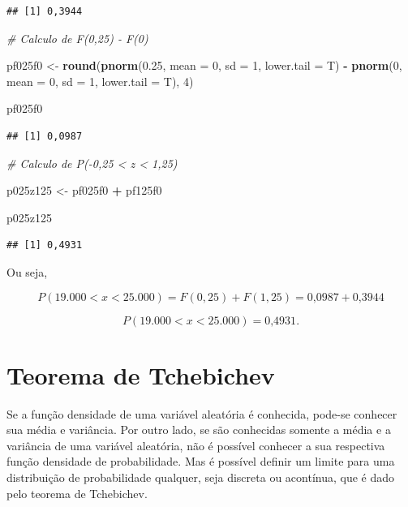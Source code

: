 \documentclass[
]{book}
\newenvironment{Shaded}{\begin{snugshade}}{\end{snugshade}}
\newcommand{\CommentTok}[1]{\textcolor[rgb]{0.56,0.35,0.01}{\textit{#1}}}
\newcommand{\DataTypeTok}[1]{\textcolor[rgb]{0.13,0.29,0.53}{#1}}
\newcommand{\DecValTok}[1]{\textcolor[rgb]{0.00,0.00,0.81}{#1}}
\newcommand{\FloatTok}[1]{\textcolor[rgb]{0.00,0.00,0.81}{#1}}
\newcommand{\KeywordTok}[1]{\textcolor[rgb]{0.13,0.29,0.53}{\textbf{#1}}}
\newcommand{\NormalTok}[1]{#1}
\newcommand{\OperatorTok}[1]{\textcolor[rgb]{0.81,0.36,0.00}{\textbf{#1}}}
\newcommand{\StringTok}[1]{\textcolor[rgb]{0.31,0.60,0.02}{#1}}
\begin{document}
\begin{verbatim}
## [1] 0,3944
\end{verbatim}

\begin{Shaded}
\begin{Highlighting}[]
\CommentTok{# Calculo de F(0,25) - F(0)}

\NormalTok{pf025f0 <-}\StringTok{ }\KeywordTok{round}\NormalTok{(}\KeywordTok{pnorm}\NormalTok{(}\FloatTok{0.25}\NormalTok{, }\DataTypeTok{mean =} \DecValTok{0}\NormalTok{, }\DataTypeTok{sd =} \DecValTok{1}\NormalTok{, }\DataTypeTok{lower.tail =}\NormalTok{ T) }\OperatorTok{-}\StringTok{ }
\StringTok{    }\KeywordTok{pnorm}\NormalTok{(}\DecValTok{0}\NormalTok{, }\DataTypeTok{mean =} \DecValTok{0}\NormalTok{, }\DataTypeTok{sd =} \DecValTok{1}\NormalTok{, }\DataTypeTok{lower.tail =}\NormalTok{ T), }\DecValTok{4}\NormalTok{)}

\NormalTok{pf025f0}
\end{Highlighting}
\end{Shaded}

\begin{verbatim}
## [1] 0,0987
\end{verbatim}

\begin{Shaded}
\begin{Highlighting}[]
\CommentTok{# Calculo de P(-0,25 < z < 1,25)}

\NormalTok{p025z125 <-}\StringTok{ }\NormalTok{pf025f0 }\OperatorTok{+}\StringTok{ }\NormalTok{pf125f0}

\NormalTok{p025z125}
\end{Highlighting}
\end{Shaded}

\begin{verbatim}
## [1] 0,4931
\end{verbatim}

Ou seja,

\[
  P(19.000 < x <25.000) = F(0,25)  +  F(1,25) = \text{0,0987} + \text{0,3944}
\]

\[
  P(19.000 < x <25.000) = \text{0,4931}.
\]

\hypertarget{teorema-de-tchebichev}{%
\section{Teorema de Tchebichev}\label{teorema-de-tchebichev}}

Se a função densidade de uma variável aleatória é conhecida, pode-se conhecer sua média e variância. Por outro lado, se são conhecidas somente a média e a variância de uma variável aleatória, não é possível conhecer a sua respectiva função densidade de probabilidade. Mas é possível definir um limite para uma distribuição de probabilidade qualquer, seja discreta ou acontínua, que é dado pelo teorema de Tchebichev.
\end{document}
